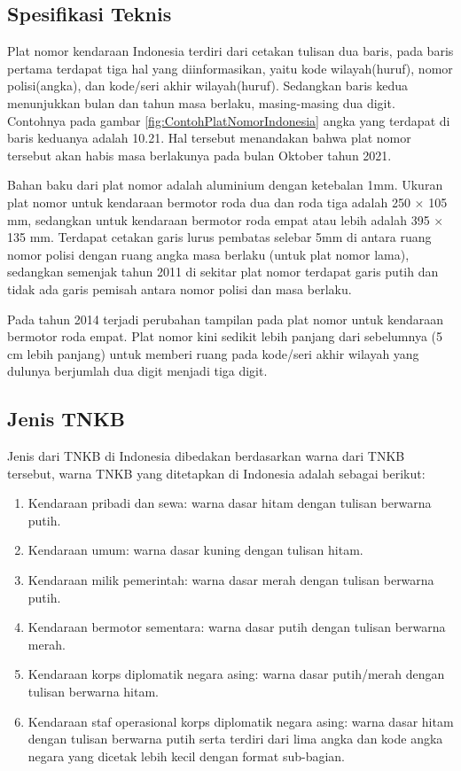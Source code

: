 \subsection{Spesifikasi Teknis}
\noindent Plat nomor kendaraan Indonesia terdiri dari cetakan tulisan dua baris, pada baris pertama terdapat tiga hal yang diinformasikan, yaitu kode wilayah(huruf), nomor polisi(angka), dan kode/seri akhir wilayah(huruf). Sedangkan baris kedua menunjukkan bulan dan tahun masa berlaku, masing-masing dua digit. Contohnya pada gambar \ref{fig:ContohPlatNomorIndonesia} angka yang terdapat di baris keduanya adalah 10.21. Hal tersebut menandakan bahwa plat nomor tersebut akan habis masa berlakunya pada bulan Oktober tahun 2021.

\noindent Bahan baku dari plat nomor adalah aluminium dengan ketebalan 1mm. Ukuran plat nomor untuk kendaraan bermotor roda dua dan roda tiga adalah 250 $\times$ 105 mm, sedangkan untuk kendaraan bermotor roda empat atau lebih adalah 395 $\times$ 135 mm. Terdapat cetakan garis lurus pembatas selebar 5mm di antara ruang nomor polisi dengan ruang angka masa berlaku (untuk plat nomor lama), sedangkan semenjak tahun 2011 di sekitar plat nomor terdapat garis putih dan tidak ada garis pemisah antara nomor polisi dan masa berlaku.

\noindent Pada tahun 2014 terjadi perubahan tampilan pada plat nomor untuk kendaraan bermotor roda empat. Plat nomor kini sedikit lebih panjang dari sebelumnya (5 cm lebih panjang) untuk memberi ruang pada kode/seri akhir wilayah yang dulunya berjumlah dua digit menjadi tiga digit.\\

\subsection{Jenis TNKB}
\noindent Jenis dari TNKB di Indonesia dibedakan berdasarkan warna dari TNKB tersebut, warna TNKB yang ditetapkan di Indonesia adalah sebagai berikut:
\begin{enumerate}
\item Kendaraan pribadi dan sewa: warna dasar hitam dengan tulisan berwarna putih.
\item Kendaraan umum: warna dasar kuning dengan tulisan hitam.
\item Kendaraan milik pemerintah: warna dasar merah dengan tulisan berwarna putih.
\item Kendaraan bermotor sementara: warna dasar putih dengan tulisan berwarna merah.
\item Kendaraan korps diplomatik negara asing: warna dasar putih/merah dengan tulisan berwarna hitam.
\item Kendaraan staf operasional korps diplomatik negara asing: warna dasar hitam dengan tulisan berwarna putih serta terdiri dari lima angka dan kode angka negara yang dicetak lebih kecil dengan format sub-bagian.
\end{enumerate}

